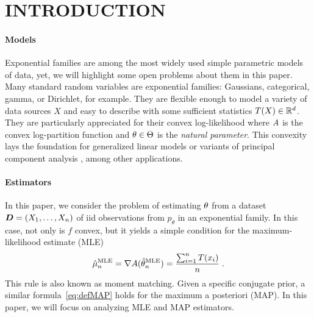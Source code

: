 \section{INTRODUCTION}
\label{sec:motivation}

\paragraph{Models}
Exponential families are among the most widely used simple parametric models of data, yet, we will highlight some open problems about them in this paper.
Many standard random variables are exponential families: Gaussians, categorical, gamma, or Dirichlet, for example.
They are flexible enough to model a variety of data sources $X$ and easy to describe with some sufficient statistics $T(X) \in \mathbb{R}^d$.
They are particularly appreciated for their convex log-likelihood
where $A$ is the convex log-partition function and \mbox{$\theta\in\Theta$} is the \textit{natural parameter}.
This convexity lays the foundation for generalized linear models \citep{mccullagh1989generalized} or variants of principal component analysis \citep{collins2001generalization}, among other applications.

\paragraph{Estimators}
In this paper, we consider the problem of estimating $\theta$ from a dataset ${\bm{D}} = (X_1, \dots, X_n)$ of iid observations from $p_\theta$ in an exponential family.
In this case, not only is $f$ convex, but it yields a simple condition for the maximum-likelihood estimate (MLE)
\begin{align}
 \hat \mu_n^\text{MLE} = \nabla  A(\hat {\theta}_n^\text{MLE}) = \frac{\sum_{i=1}^n T(x_i)}{n} \; .
	\label{eq:defMLE}
\end{align}
This rule is also known as moment matching.
Given a specific conjugate prior, a similar formula~\eqref{eq:defMAP} holds for the maximum a posteriori (MAP). In this paper, we will focus on analyzing MLE and MAP estimators.

